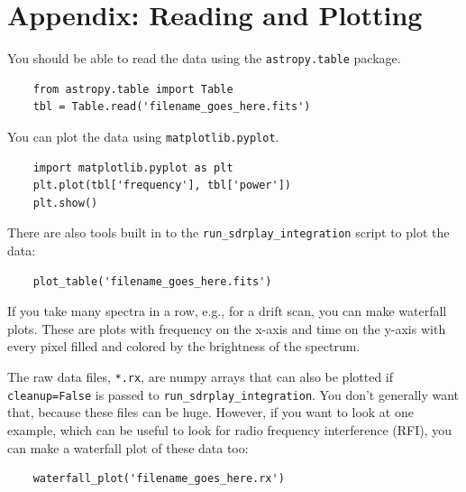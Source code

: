 \documentclass[11pt]{article}
\begin{document}
\section{Appendix: Reading and Plotting}

You should be able to read the data using the \verb|astropy.table| package.

\begin{verbatim}
    from astropy.table import Table
    tbl = Table.read('filename_goes_here.fits')
\end{verbatim}

You can plot the data using \verb|matplotlib.pyplot|.

\begin{verbatim}
    import matplotlib.pyplot as plt
    plt.plot(tbl['frequency'], tbl['power'])
    plt.show()
\end{verbatim}

There are also tools built in to the \verb|run_sdrplay_integration| script to plot the data:

\begin{verbatim}
    plot_table('filename_goes_here.fits')
\end{verbatim}

If you take many spectra in a row, e.g., for a drift scan, you can make waterfall plots.
These are plots with frequency on the x-axis and time on the y-axis with every pixel filled and colored by the brightness of the spectrum.

The raw data files, \verb|*.rx|, are numpy arrays that can also be plotted if \verb|cleanup=False| is passed to \verb|run_sdrplay_integration|.
You don't generally want that, because these files can be huge.
However, if you want to look at one example, which can be useful to look for radio frequency interference (RFI), you can make a waterfall plot of these data too:

\begin{verbatim}
    waterfall_plot('filename_goes_here.rx')
\end{verbatim}
\end{document}
